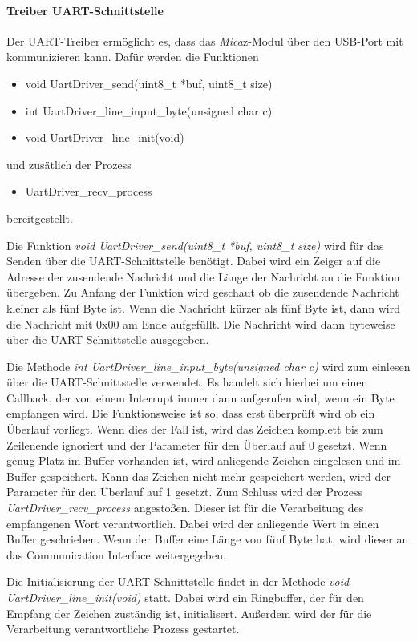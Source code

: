 \paragraph{Treiber UART-Schnittstelle}
Der UART-Treiber ermöglicht es, dass das \textit{Mica}z-Modul über den USB-Port mit kommunizieren kann. Dafür werden die Funktionen
\begin{itemize}
  \item void UartDriver\_send(uint8\_t *buf, uint8\_t size)
  \item int UartDriver\_line\_input\_byte(unsigned char c)
  \item void UartDriver\_line\_init(void)
\end{itemize}
und zusätlich der Prozess
\begin{itemize}
  \item UartDriver\_recv\_process
\end{itemize}
bereitgestellt.

Die Funktion \textit{void UartDriver\_send(uint8\_t *buf, uint8\_t size)} wird für das Senden über die UART-Schnittstelle benötigt. Dabei wird ein Zeiger auf die Adresse der zusendende Nachricht und die Länge der Nachricht an die Funktion übergeben. Zu Anfang der Funktion wird geschaut ob die zusendende Nachricht kleiner als fünf Byte ist. Wenn die Nachricht kürzer als fünf Byte ist, dann wird die Nachricht mit 0x00 am Ende aufgefüllt. Die Nachricht wird dann byteweise über die UART-Schnittstelle ausgegeben.

Die Methode \textit{int UartDriver\_line\_input\_byte(unsigned char c)} wird zum einlesen über die UART-Schnittstelle verwendet. Es handelt sich hierbei um einen Callback, der von einem Interrupt immer dann aufgerufen wird, wenn ein Byte empfangen wird. Die Funktionsweise ist so, dass erst überprüft wird ob ein Überlauf vorliegt. Wenn dies der Fall ist, wird das Zeichen komplett bis zum Zeilenende ignoriert und der Parameter für den Überlauf auf 0 gesetzt. Wenn genug Platz im Buffer vorhanden ist, wird anliegende Zeichen eingelesen und im Buffer gespeichert. Kann das Zeichen nicht mehr gespeichert werden, wird der Parameter für den Überlauf auf 1 gesetzt. Zum Schluss wird der Prozess \textit{UartDriver\_recv\_process} angestoßen. Dieser ist für die Verarbeitung des empfangenen Wort verantwortlich. Dabei wird der anliegende Wert in einen Buffer geschrieben. Wenn der Buffer eine Länge von fünf Byte hat, wird dieser an das Communication Interface weitergegeben.

Die Initialisierung der UART-Schnittstelle findet in der Methode \textit{void UartDriver\_line\_init(void)} statt. Dabei wird ein Ringbuffer, der für den Empfang der Zeichen zuständig ist, initialisert. Außerdem wird der für die Verarbeitung verantwortliche Prozess gestartet.

